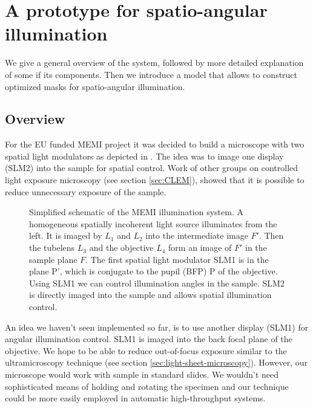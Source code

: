 
\newcommand{\imagw}[3]{
  \begin{figure}[!hbt]
    \centering
    \texttt{[image: \#2]}
    \caption{#3}
    \label{fig:#2}
  \end{figure}
}

\newcommand{\imag}[2]{\imagw{16cm}{#1}{#2}}

\chapter{A prototype for spatio-angular illumination}
\label{sec:setup}
\begin{summary}
  We give a general overview of the system, followed by more detailed
  explanation of some if its components. Then we introduce a model
  that allows to construct optimized masks for spatio-angular
  illumination.
\end{summary}

\section{Overview}
For the EU funded MEMI project it was decided to build a microscope
with two spatial light modulators as depicted in
. The idea was to image one display (SLM2)
into the sample for spatial control. Work of other groups on
controlled light exposure microscopy (see section \ref{sec:CLEM}),
showed that it is possible to reduce unnecessary exposure of the
sample.

\begin{figure}[!hbt]
  \centering
  \def\svgscale{1.5}
  
  \caption{Simplified schematic of the MEMI illumination system. A
    homogeneous spatially incoherent light source illuminates from the
    left. It is imaged by $L_1$ and $L_2$ into the intermediate image
    $F'$. Then the tubelens $L_3$ and the objective $L_4$ form an
    image of $F'$ in the sample plane $F$. The first spatial light
    modulator SLM1 is in the plane P', which is conjugate to the pupil
    (BFP) P of the objective. Using SLM1 we can control illumination
    angles in the sample. SLM2 is directly imaged into the sample and
    allows spatial illumination control.} \label{fig:memi-simple}
\end{figure}

An idea we haven't seen implemented so far, is to use another display
(SLM1) for angular illumination control. SLM1 is imaged into the back
focal plane of the objective. We hope to be able to reduce
out-of-focus exposure similar to the ultramicroscopy technique (see
section \ref{sec:light-sheet-microscopy}). However, our microscope
would work with sample in standard slides. We wouldn't need
sophisticated means of holding and rotating the specimen and our
technique could be more easily employed in automatic high-throughput
systems.

